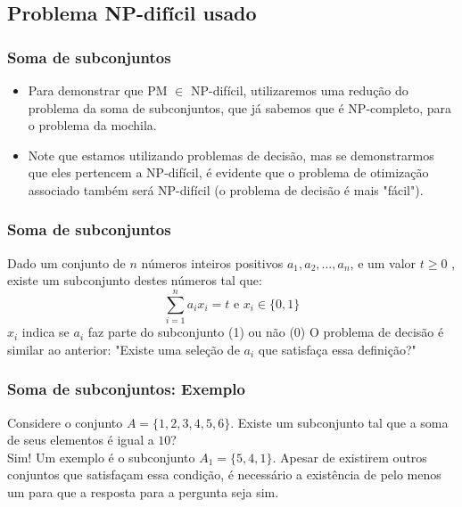 \documentclass{beamer}
\begin{document}
\subsection{Problema NP-difícil usado}
\begin{frame}
    \frametitle{Soma de subconjuntos}
    \begin{itemize}
        \item
            Para demonstrar que PM $\in$ NP-difícil, utilizaremos uma redução do problema
            da soma de subconjuntos, que já sabemos que é NP-completo, para o problema da mochila.
        \item
            Note que estamos utilizando problemas de decisão, mas se demonstrarmos que
            eles pertencem a NP-difícil, é evidente que o problema de otimização associado
            também será NP-difícil (o problema de decisão é mais "fácil").
    \end{itemize}

\end{frame}

\begin{frame}
    \frametitle{Soma de subconjuntos}
        Dado um conjunto de $n$ números inteiros positivos $a_{1}, a_{2}, ..., a_{n}$, e um valor $t \geq 0$ , existe um subconjunto destes números tal que:
         \begin{equation*}
            \sum_{i=1}^{n} a_{i} x_{i} = t \mbox{ e } x_{i} \in \{0,1\}
         \end{equation*}
        $x_{i}$ indica se $a_{i}$ faz parte do subconjunto (1) ou não (0)
        \newline
        \newline
        O problema de decisão é similar ao anterior: "Existe uma seleção de $a_{i}$ que satisfaça essa definição?"
\end{frame}

\begin{frame}
    \frametitle{Soma de subconjuntos: Exemplo}
        Considere o conjunto $A = \{1, 2, 3, 4, 5, 6\}$. Existe um subconjunto tal que a soma de seus elementos é igual a $10$? \\
        Sim! Um exemplo é o subconjunto $A_{1} = \{5, 4, 1\}$. Apesar de existirem outros conjuntos que satisfaçam essa condição, é necessário a existência de pelo menos um para que a resposta para a pergunta seja sim.
\end{frame}

\end{document}
